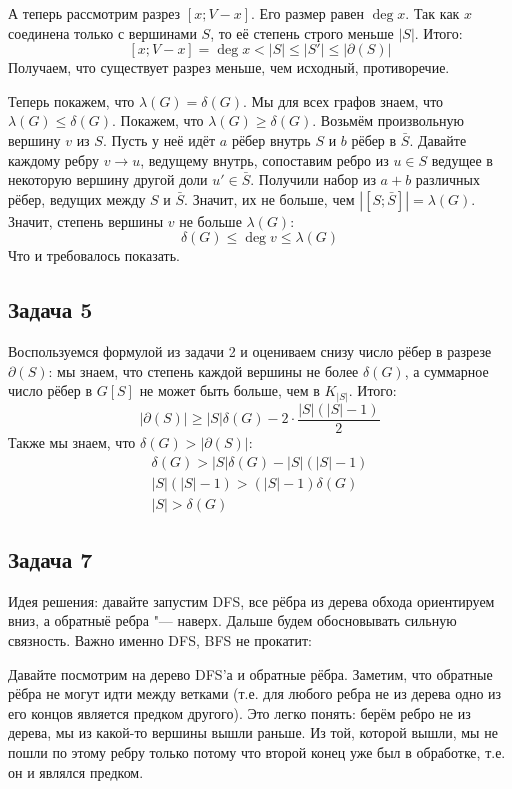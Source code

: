 	А теперь рассмотрим разрез $[x; V-x]$.
	Его размер равен $\deg x$.
	Так как $x$ соединена только с вершинами $S$, то её степень строго меньше $|S|$.
	Итого:
	\[ [x; V - x] = \deg x < |S| \le |S'| \le |\partial(S)| \]
	Получаем, что существует разрез меньше, чем исходный, противоречие.

	Теперь покажем, что $\lambda(G)=\delta(G)$.
	Мы для всех графов знаем, что $\lambda(G) \le \delta(G)$.
	Покажем, что $\lambda(G) \ge \delta(G)$.
	Возьмём произвольную вершину $v$ из $S$.
	Пусть у неё идёт $a$ рёбер внутрь $S$ и $b$ рёбер в $\bar S$.
	Давайте каждому ребру $v \to u$, ведущему внутрь, сопоставим ребро из $u \in S$ ведущее
	в некоторую вершину другой доли $u' \in \bar S$.
	Получили набор из $a+b$ различных рёбер, ведущих между $S$ и $\bar S$.
	Значит, их не больше, чем $|[S; \bar S]|=\lambda(G)$.
	Значит, степень вершины $v$ не больше $\lambda(G)$:
	\[ \delta(G) \le \deg v \le \lambda(G) \]
	Что и требовалось показать.

\subsection{Задача 5}
	Воспользуемся формулой из задачи 2 и оцениваем снизу число рёбер в разрезе $\partial(S)$:
	мы знаем, что степень каждой вершины не более $\delta(G)$, а суммарное число рёбер в
	$G[S]$ не может быть больше, чем в $K_{|S|}$.
	Итого:
	\[ |\partial(S)| \ge |S|\delta(G) - 2\cdot\frac{|S|(|S|-1)}{2} \]
	Также мы знаем, что $\delta(G) > |\partial(S)|$:
	\begin{gather*}
		\delta(G) > |S|\delta(G) - |S|(|S|-1) \\
		|S|(|S|-1) > (|S|-1)\delta(G) \\
		|S| >  \delta(G)
	\end{gather*}

\subsection{Задача 7}
	Идея решения: давайте запустим DFS, все рёбра из дерева обхода ориентируем вниз,
	а обратныё ребра "--- наверх.
	Дальше будем обосновывать сильную связность.
	Важно именно DFS, BFS не прокатит:

	Давайте посмотрим на дерево DFS'а и обратные рёбра.
	Заметим, что обратные рёбра не могут идти между ветками (т.е. для любого ребра не из дерева
	одно из его концов является предком другого).
	Это легко понять: берём ребро не из дерева, мы из какой-то вершины вышли раньше.
	Из той, которой вышли, мы не пошли по этому ребру только потому что второй конец уже был в обработке,
	т.е. он и являлся предком.

